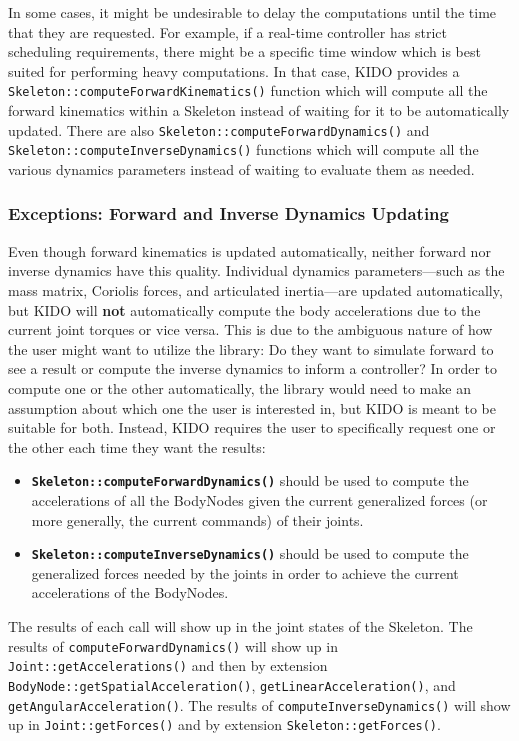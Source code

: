 In some cases, it might be undesirable to delay the computations until the time that they are requested. For example, if a real-time controller has strict scheduling requirements, there might be a specific time window which is best suited for performing heavy computations. In that case, KIDO provides a \texttt{Skeleton::computeForwardKinematics()} function which will compute all the forward kinematics within a Skeleton instead of waiting for it to be automatically updated. There are also \texttt{Skeleton::computeForwardDynamics()} and \texttt{Skeleton::computeInverseDynamics()} functions which will compute all the various dynamics parameters instead of waiting to evaluate them as needed.

\subsubsection{Exceptions: Forward and Inverse Dynamics Updating}
\label{sec:lazy_exception}
Even though forward kinematics is updated automatically, neither forward nor inverse dynamics have this quality. Individual dynamics parameters---such as the mass matrix, Coriolis forces, and articulated inertia---are updated automatically, but KIDO will \textbf{not} automatically compute the body accelerations due to the current joint torques or vice versa. This is due to the ambiguous nature of how the user might want to utilize the library: Do they want to simulate forward to see a result or compute the inverse dynamics to inform a controller? In order to compute one or the other automatically, the library would need to make an assumption about which one the user is interested in, but KIDO is meant to be suitable for both. Instead, KIDO requires the user to specifically request one or the other each time they want the results:

\begin{itemize}
  \item \textbf{\texttt{Skeleton::computeForwardDynamics()}} should be used to compute the accelerations of all the BodyNodes given the current generalized forces (or more generally, the current commands) of their joints.
  \item \textbf{\texttt{Skeleton::computeInverseDynamics()}} should be used to compute the generalized forces needed by the joints in order to achieve the current accelerations of the BodyNodes.
\end{itemize}

The results of each call will show up in the joint states of the Skeleton. The results of \texttt{computeForwardDynamics()} will show up in \texttt{Joint::getAccelerations()} and then by extension \texttt{BodyNode::getSpatialAcceleration()}, \texttt{getLinearAcceleration()}, and \texttt{getAngularAcceleration()}. The results of \texttt{computeInverseDynamics()} will show up in \texttt{Joint::getForces()} and by extension \texttt{Skeleton::getForces()}.

